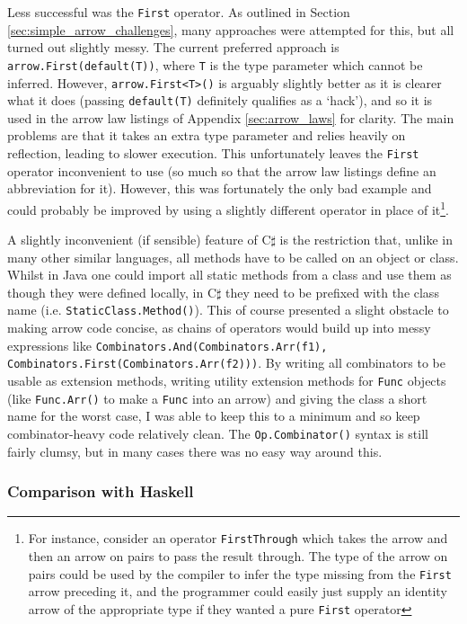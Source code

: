 \documentclass[12pt,twoside,notitlepage]{report}
\begin{document}
Less successful was the \texttt{First} operator. As outlined in Section \ref{sec:simple_arrow_challenges}, many approaches were attempted for this, but all turned out slightly messy. The current preferred approach is \texttt{arrow.First(default(T))}, where \texttt{T} is the type parameter which cannot be inferred. However, \texttt{arrow.First<T>()} is arguably slightly better as it is clearer what it does (passing \texttt{default(T)} definitely qualifies as a `hack'), and so it is used in the arrow law listings of Appendix \ref{sec:arrow_laws} for clarity. The main problems are that it takes an extra type parameter and relies heavily on reflection, leading to slower execution. This unfortunately leaves the \texttt{First} operator inconvenient to use (so much so that the arrow law listings define an abbreviation for it). However, this was fortunately the only bad example and could probably be improved by using a slightly different operator in place of it\footnote{For instance, consider an operator \texttt{FirstThrough} which takes the arrow and then an arrow on pairs to pass the result through. The type of the arrow on pairs could be used by the compiler to infer the type missing from the \texttt{First} arrow preceding it, and the programmer could easily just supply an identity arrow of the appropriate type if they wanted a pure \texttt{First} operator}.

A slightly inconvenient (if sensible) feature of C$\sharp$ is the restriction that, unlike in many other similar languages, all methods have to be called on an object or class. Whilst in Java one could import all static methods from a class and use them as though they were defined locally, in C$\sharp$ they need to be prefixed with the class name (i.e. \texttt{StaticClass.Method()}). This of course presented a slight obstacle to making arrow code concise, as chains of operators would build up into messy expressions like \texttt{Combinators.And(Combinators.Arr(f1), Combinators.First(Combinators.Arr(f2)))}. By writing all combinators to be usable as extension methods, writing utility extension methods for \texttt{Func} objects (like \texttt{Func.Arr()} to make a \texttt{Func} into an arrow) and giving the class a short name for the worst case, I was able to keep this to a minimum and so keep combinator-heavy code relatively clean. The \texttt{Op.Combinator()} syntax is still fairly clumsy, but in many cases there was no easy way around this.

\subsubsection{Comparison with Haskell} \label{sec:syntax_comparison_haskell}
\end{document}
